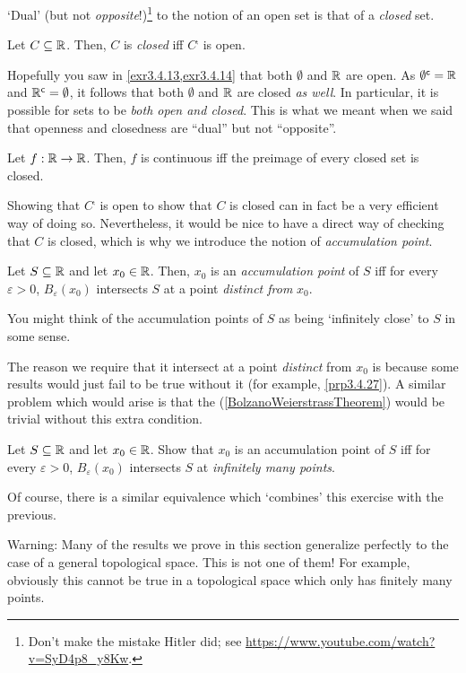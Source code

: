 `Dual' (but not \emph{opposite}!)\footnote{Don't make the mistake Hitler did; see \url{https://www.youtube.com/watch?v=SyD4p8_y8Kw}.} to the notion of an open set is that of a \emph{closed} set.
\begin{dfn}\label{dfn3.4.17}
Let $C\subseteq \mathbb{R}$.  Then, $C$ is \emph{closed} iff $C^{\comp}$ is open.
\end{dfn}
\begin{exm}
Hopefully you saw in \cref{exr3.4.13,exr3.4.14} that both $\emptyset$ and $\mathbb{R}$ are open.  As $\emptyset ^{\mathsf{c}}=\mathbb{R}$ and $\mathbb{R} ^{\mathsf{c}}=\emptyset$, it follows that both $\emptyset$ and $\mathbb{R}$ are closed \emph{as well}.  In particular, it is possible for sets to be \emph{both open and closed}.  This is what we meant when we said that openness and closedness are ``dual'' but not ``opposite''.
\end{exm}
\begin{exr}
Let $f:\mathbb{R} \rightarrow \mathbb{R}$.  Then, $f$ is continuous iff the preimage of every closed set is closed.
\end{exr}
Showing that $C^{\comp}$ is open to show that $C$ is closed can in fact be a very efficient way of doing so.  Nevertheless, it would be nice to have a direct way of checking that $C$ is closed, which is why we introduce the notion of \emph{accumulation point}.
\begin{dfn}\label{dfn3.4.20}
Let $S\subseteq \mathbb{R}$ and let $x_0\in \mathbb{R}$.  Then, $x_0$ is an \emph{accumulation point} of $S$ iff for every $\varepsilon >0$, $B_\varepsilon (x_0)$ intersects $S$ at a point \emph{distinct from} $x_0$.
\begin{rmk}
You might think of the accumulation points of $S$ as being `infinitely close' to $S$ in some sense.
\end{rmk}
\begin{rmk}
The reason we require that it intersect at a point \emph{distinct} from $x_0$ is because some results would just fail to be true without it (for example, \cref{prp3.4.27}).  A similar problem which would arise is that the  (\cref{BolzanoWeierstrassTheorem}) would be trivial without this extra condition.
\end{rmk}
\end{dfn}
\begin{exr}\label{exr3.4.22}
Let $S\subseteq \mathbb{R}$ and let $x_0\in \mathbb{R}$.  Show that $x_0$ is an accumulation point of $S$ iff for every $\varepsilon >0$, $B_\varepsilon (x_0)$ intersects $S$ at \emph{infinitely many points}.
\begin{rmk}
Of course, there is a similar equivalence which `combines' this exercise with the previous.
\end{rmk}
\begin{rmk}
Warning:  Many of the results we prove in this section generalize perfectly to the case of a general topological space.  This is not one of them!  For example, obviously this cannot be true in a topological space which only has finitely many points.
\end{rmk}
\end{exr}

